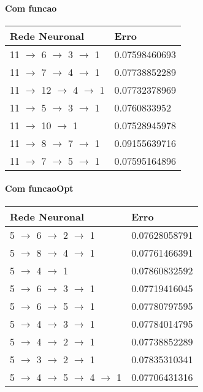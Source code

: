 \documentclass{article}
\begin{document}
\paragraph{Com funcao}
\begin{center}
\begin{tabular}{ | l | l | }
\hline
Rede Neuronal & Erro\\ \hline
11 $\to$ 6 $\to$ 3 $\to$ 1 & 0.07598460693\\ \hline
11 $\to$ 7 $\to$ 4 $\to$ 1 & 0.07738852289\\ \hline
11 $\to$ 12 $\to$ 4 $\to$ 1 & 0.07732378969\\ \hline
11 $\to$ 5 $\to$ 3 $\to$ 1 & 0.0760833952\\ \hline
11 $\to$ 10 $\to$ 1 & 0.07528945978\\ \hline
11 $\to$ 8 $\to$ 7 $\to$ 1 & 0.09155639716\\ \hline
11 $\to$ 7 $\to$ 5 $\to$ 1 & 0.07595164896\\ \hline
\end{tabular}
\end{center}

\paragraph{Com funcaoOpt}
\begin{center}
\begin{tabular}{ | l | l | }
\hline
Rede Neuronal & Erro\\ \hline
5 $\to$ 6 $\to$ 2 $\to$ 1 & 0.07628058791\\ \hline
5 $\to$ 8 $\to$ 4 $\to$ 1 & 0.07761466391\\ \hline
5 $\to$ 4 $\to$ 1 & 0.07860832592\\ \hline
5 $\to$ 6 $\to$ 3 $\to$ 1 & 0.07719416045\\ \hline
5 $\to$ 6 $\to$ 5 $\to$ 1 & 0.07780797595\\ \hline
5 $\to$ 4 $\to$ 3 $\to$ 1 & 0.07784014795\\ \hline
5 $\to$ 4 $\to$ 2 $\to$ 1 & 0.07738852289\\ \hline
5 $\to$ 3 $\to$ 2 $\to$ 1 & 0.07835310341\\ \hline
5 $\to$ 4 $\to$ 5 $\to$ 4 $\to$ 1 & 0.07706431316\\ \hline
\end{tabular}
\end{center}
\end{document}
